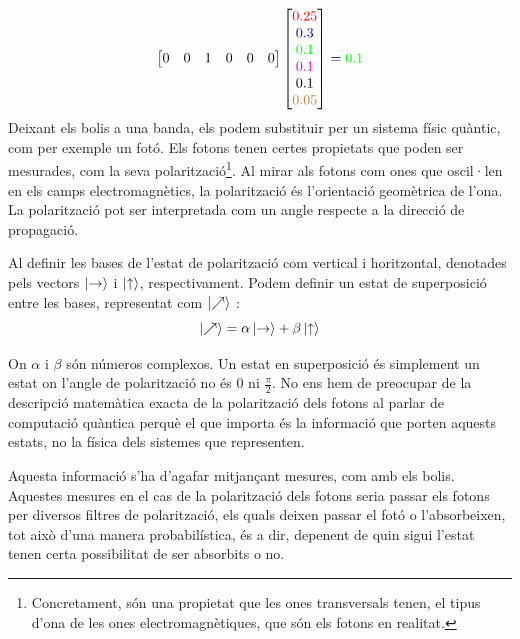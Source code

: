 $$
\begin{bmatrix}
	0 & 0 & 1 & 0 & 0 & 0\\
\end{bmatrix}
\begin{bmatrix}
	\textcolor{red}{0.25} \\
	\textcolor{blue}{0.3 }\\
	\textcolor{green}{0.1 }\\
	\textcolor{magenta}{0.1 }\\
	\textcolor{black}{0.1 }\\
	\textcolor{brown}{0.05}
\end{bmatrix} = \textcolor{green}{0.1 }
$$
Deixant els bolis a una banda, els podem substituir per un sistema físic quàntic, com per exemple un fotó. Els fotons tenen certes propietats que poden ser mesurades, com la seva polarització\footnote{Concretament, són una propietat que les ones transversals tenen, el tipus d'ona de les ones electromagnètiques, que són els fotons en realitat.}. Al mirar als fotons com ones que oscil·len en els camps electromagnètics, la polarització és l'orientació geomètrica de l'ona. La polarització pot ser interpretada com un angle respecte a la direcció de propagació.

Al definir les bases de l'estat de polarització com vertical i horitzontal, denotades pels vectors $\ket{\text{\textrightarrow}}$ i $\ket{\text{\textuparrow}}$, respectivament. Podem definir un estat de superposició entre les bases, representat com $\ket{\nearrow}$ \cite{QC_intro:photon}:
\begin{equation}
	\ket{\nearrow} = \alpha\ket{\text{\textrightarrow}} + \beta\ket{\text{\textuparrow}}
	\label{eq:photon_state}
\end{equation}

On $\alpha$ i $\beta$ són números complexos. 
Un estat en superposició és simplement un estat on l'angle de polarització no és $0$ ni $\frac{\pi}{2}$. No ens hem de preocupar de la descripció matemàtica exacta de la polarització dels fotons al parlar de computació quàntica perquè el que importa és la informació que porten aquests estats, no la física dels sistemes que representen.

Aquesta informació s'ha d'agafar mitjançant mesures, com amb els bolis. Aquestes mesures en el cas de la polarització dels fotons seria passar els fotons per diversos filtres de polarització, els quals deixen passar el fotó o l'absorbeixen, tot això d'una manera probabilística, és a dir, depenent de quin sigui l'estat tenen certa possibilitat de ser absorbits o no.

